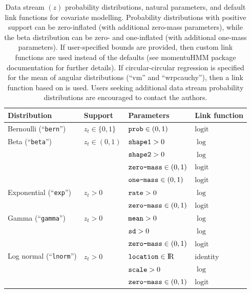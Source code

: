 \documentclass[12pt]{article}\usepackage[]{graphicx}\usepackage[]{color}
\begin{document}
\begin{table}
  \caption{\label{tab:pdfs} Data stream $(z)$ probability distributions, natural parameters, and default link functions for covariate modelling. Probability distributions with positive support can be zero-inflated (with additional zero-mass parameters), while the beta distribution can be zero- and one-inflated (with additional one-mass parameters). If user-specified bounds are provided, then custom link functions are used instead of the defaults (see momentuHMM package documentation for further details). If circular-circular regression is specified for the mean of angular distributions (``vm'' and ``wrpcauchy''), then a link function based on \cite{DuchesneEtAl2015} is used. Users seeking additional data stream probability distributions are encouraged to contact the authors.}
  \begin{tabular}{llll}
  \toprule
  Distribution & Support & Parameters & Link function\footnotemark \tabularnewline
  \midrule
  Bernoulli (``\verb|bern|'')          & $z_t\in\{0,1\}$          & $\verb|prob|\in(0,1)$            &  $\text{logit}$ \tabularnewline  
  Beta (``\verb|beta|'')               & $z_t\in(0,1)$            & $\verb|shape1|>0$                &  $\log$ \tabularnewline  
                                       &                          & $\verb|shape2|>0$                &  $\log$ \tabularnewline
                                       &                          & $\verb|zero-mass|\in(0,1)$       &  $\text{logit}$ \tabularnewline 
                                       &                          & $\verb|one-mass|\in(0,1)$        &  $\text{logit}$ \tabularnewline 
  Exponential (``\verb|exp|'')         & $z_t>0$                  & $\verb|rate|>0$                  &  $\log$ \tabularnewline  
                                       &                          & $\verb|zero-mass|\in(0,1)$       &  $\text{logit}$ \tabularnewline 
  Gamma (``\verb|gamma|'')             & $z_t>0$                  & $\verb|mean|>0$                  &  $\log$ \tabularnewline  
                                       &                          & $\verb|sd|>0$                    &  $\log$ \tabularnewline  
                                       &                          & $\verb|zero-mass|\in(0,1)$       &  $\text{logit}$ \tabularnewline 
  Log normal (``\verb|lnorm|'')        & $z_t>0$                  & $\verb|location|\in{\rm I\!R}$   &  identity \tabularnewline  
                                       &                          & $\verb|scale|>0$                 &  $\log$ \tabularnewline  
                                       &                          & $\verb|zero-mass|\in(0,1)$       &  $\text{logit}$ \tabularnewline 

\end{tabular}
\end{table}
\end{document}
